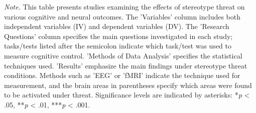 \documentclass[
  stu, a4paper, 12pt,mask,floatsintext]{apa7}
\newenvironment{lltable}{\begin{landscape}\centering\begin{ThreePartTable}}{\end{ThreePartTable}\end{landscape}}
\begin{document}
\begin{lltable}

\begin{TableNotes}[para]
\normalsize{\textit{Note.} This table presents studies examining the effects of stereotype threat on various cognitive and neural outcomes. The 'Variables' column includes both independent variables (IV) and dependent variables (DV). The 'Research Questions' column specifies the main questions investigated in each study; tasks/tests listed after the semicolon indicate which task/test was used to measure cognitive control. 'Methods of Data Analysis' specifies the statistical techniques used. 'Results' emphasize the main findings under stereotype threat conditions. Methods such as 'EEG' or 'fMRI' indicate the technique used for measurement, and the brain areas in parentheses specify which areas were found to be activated under threat. Significance levels are indicated by asterisks: *\textit{p} < .05, **\textit{p} < .01, ***\textit{p} < .001.}
\end{TableNotes}

\small{

}
\end{lltable}
\end{document}
